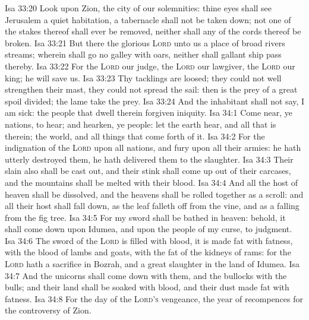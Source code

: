 \vs Isa 33:20 Look upon Zion, the city of our solemnities: thine eyes shall see Jerusalem a quiet habitation, a tabernacle  shall not be taken down; not one of the stakes thereof shall ever be removed, neither shall any of the cords thereof be broken.
\vs Isa 33:21 But there the glorious \textsc{Lord}  unto us a place of broad rivers  streams; wherein shall go no galley with oars, neither shall gallant ship pass thereby.
\vs Isa 33:22 For the \textsc{Lord}  our judge, the \textsc{Lord}  our lawgiver, the \textsc{Lord}  our king; he will save us.
\vs Isa 33:23 Thy tacklings are loosed; they could not well strengthen their mast, they could not spread the sail: then is the prey of a great spoil divided; the lame take the prey.
\vs Isa 33:24 And the inhabitant shall not say, I am sick: the people that dwell therein  forgiven  iniquity.
\vs Isa 34:1 Come near, ye nations, to hear; and hearken, ye people: let the earth hear, and all that is therein; the world, and all things that come forth of it.
\vs Isa 34:2 For the indignation of the \textsc{Lord}  upon all nations, and  fury upon all their armies: he hath utterly destroyed them, he hath delivered them to the slaughter.
\vs Isa 34:3 Their slain also shall be cast out, and their stink shall come up out of their carcases, and the mountains shall be melted with their blood.
\vs Isa 34:4 And all the host of heaven shall be dissolved, and the heavens shall be rolled together as a scroll: and all their host shall fall down, as the leaf falleth off from the vine, and as a falling  from the fig tree.
\vs Isa 34:5 For my sword shall be bathed in heaven: behold, it shall come down upon Idumea, and upon the people of my curse, to judgment.
\vs Isa 34:6 The sword of the \textsc{Lord} is filled with blood, it is made fat with fatness,  with the blood of lambs and goats, with the fat of the kidneys of rams: for the \textsc{Lord} hath a sacrifice in Bozrah, and a great slaughter in the land of Idumea.
\vs Isa 34:7 And the unicorns shall come down with them, and the bullocks with the bulls; and their land shall be soaked with blood, and their dust made fat with fatness.
\vs Isa 34:8 For  the day of the \textsc{Lord's} vengeance,  the year of recompences for the controversy of Zion.
